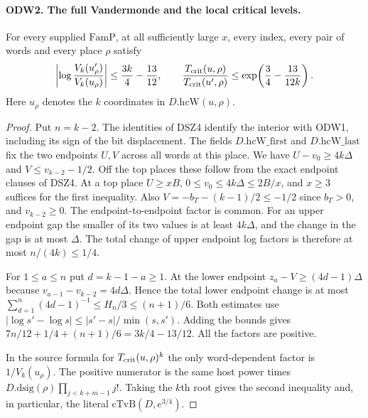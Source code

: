 \paragraph{ODW2. The full Vandermonde and the local critical levels.}
\label{claim:ODW2}
For every supplied $\mathrm{FamP}$, at all sufficiently large $x$,
every index, every pair of words and every place $\rho$ satisfy
\[
 \left|\log\frac{V_k(u'_{\rho})}{V_k(u_{\rho})}\right|
       \le \frac{3k}{4}-\frac{13}{12},\qquad
 \frac{T_{\rm crit}(u,\rho)}{T_{\rm crit}(u',\rho)}
       \le \exp\!\left(\frac34-\frac{13}{12k}\right).
\]
Here $u_{\rho}$ denotes the $k$ coordinates in $D.\mathrm{hcW}(u,\rho)$.
\begin{proof}
Put $n=k-2$. The identities of DSZ4 identify the interior with
ODW1, including its sign of the bit displacement. The fields
$D.\mathrm{hcW\_first}$ and $D.\mathrm{hcW\_last}$ fix the two
endpoints $U, V$ across all words at this place. We have
$U-v_0\ge4k\Delta$ and $V\le v_{k-2}-1/2$. Off the top places
these follow from the exact endpoint clauses of DSZ4. At a top
place $U\ge xB$, $0\le v_0\le4k\Delta\le 2B/x$, and $x\ge3$
suffices for the first inequality. Also
$V=-b_T-(k-1)/2\le-1/2$ since $b_T>0$, and $v_{k-2}\ge0$.
The endpoint-to-endpoint factor is common. For an upper endpoint
gap the smaller of its two values is at least $4k\Delta$, and
the change in the gap is at most $\Delta$. The total change of
upper endpoint log factors is therefore at most $n/(4k)\le1/4$.

For $1\le a\le n$ put $d=k-1-a\ge1$. At the lower endpoint
$z_a-V\ge(4d-1)\Delta$ because
$v_{a-1}-v_{k-2}=4d\Delta$. Hence the total lower endpoint change
is at most $\sum_{d=1}^n(4d-1)^{-1}\le H_n/3\le(n+1)/6$.
Both estimates use $|\log s'-\log s|\le |s'-s|/\min(s,s')$.
Adding the bounds gives
$7n/12+1/4+(n+1)/6=3k/4-13/12$.
All the factors are positive.

In the source formula for $T_{\rm crit}(u,\rho)^k$ the only
word-dependent factor is $1/V_k(u_\rho)$. The positive numerator is
the same host power times $D.\mathrm{dsig}(\rho)\prod_{j<k+m-1}j!$.
Taking the $k$th root gives the second inequality and, in
particular, the literal $\mathrm{cTvB}(D,e^{3/4})$.
\end{proof}

